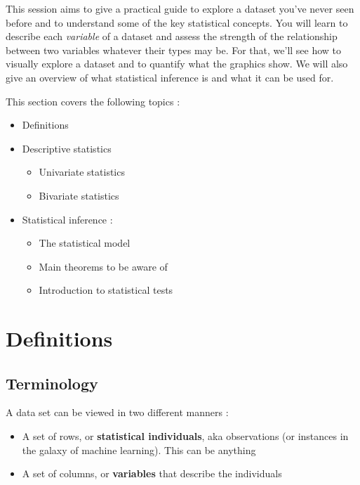 \documentclass[
]{book}
\providecommand{\tightlist}{%
  \setlength{\itemsep}{0pt}\setlength{\parskip}{0pt}}
\begin{document}
This session aims to give a practical guide to explore a dataset you've never seen before and to understand some of the key statistical concepts. You will learn to describe each \emph{variable} of a dataset and assess the strength of the relationship between two variables whatever their types may be. For that, we'll see how to visually explore a dataset and to quantify what the graphics show. We will also give an overview of what statistical inference is and what it can be used for.

This section covers the following topics :

\begin{itemize}
\tightlist
\item
  Definitions
\item
  Descriptive statistics

  \begin{itemize}
  \tightlist
  \item
    Univariate statistics
  \item
    Bivariate statistics
  \end{itemize}
\item
  Statistical inference :

  \begin{itemize}
  \tightlist
  \item
    The statistical model
  \item
    Main theorems to be aware of
  \item
    Introduction to statistical tests
  \end{itemize}
\end{itemize}

\hypertarget{definitions}{%
\section{Definitions}\label{definitions}}

\hypertarget{terminology}{%
\subsection{Terminology}\label{terminology}}

A data set can be viewed in two different manners :

\begin{itemize}
\item
  A set of rows, or \textbf{statistical individuals}, aka observations (or instances in the galaxy of machine learning). This can be anything
\item
  A set of columns, or \textbf{variables} that describe the individuals
\end{itemize}
\end{document}
